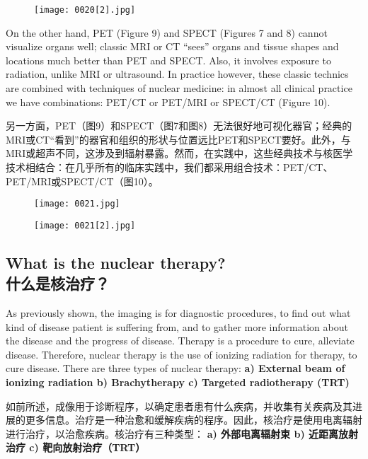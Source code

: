 \documentclass[dvipsnames, svgnames,a4paper,11pt]{article}
\begin{document}
  \begin{figure}[htbp]
      \centering
      \texttt{[image: 0020[2].jpg]}
       \label{fig8}
  \end{figure}
On the other hand, PET (Figure 9) and SPECT (Figures 7 and 8) cannot visualize organs well; classic MRI or CT “sees” organs and tissue shapes and locations much better than PET and SPECT. Also, it involves exposure to radiation, unlike MRI or ultrasound. In practice however, these classic technics are combined with techniques of nuclear medicine: in almost all clinical practice we have combinations: PET/CT or PET/MRI or SPECT/CT (Figure 10).

另一方面，PET（图9）和SPECT（图7和图8）无法很好地可视化器官；经典的MRI或CT“看到”的器官和组织的形状与位置远比PET和SPECT要好。此外，与MRI或超声不同，这涉及到辐射暴露。然而，在实践中，这些经典技术与核医学技术相结合：在几乎所有的临床实践中，我们都采用组合技术：PET/CT、PET/MRI或SPECT/CT（图10）。
\begin{figure}[htbp]
      \centering
      \texttt{[image: 0021.jpg]}
       \label{fig9}
  \end{figure}
  \begin{figure}[htbp]
      \centering
      \texttt{[image: 0021[2].jpg]}
       \label{fig10}
  \end{figure}
\subsection{What is the nuclear therapy?\\什么是核治疗？}
As previously shown, the imaging is for diagnostic procedures, to find out what kind of disease patient is suffering from, and to gather more information about the disease and the progress of disease. Therapy is a procedure to cure, alleviate disease. Therefore, nuclear therapy is the use of ionizing radiation for therapy, to cure disease. There are three types of nuclear therapy: \textbf{a) External beam of ionizing radiation b) Brachytherapy c) Targeted radiotherapy (TRT)}

如前所述，成像用于诊断程序，以确定患者患有什么疾病，并收集有关疾病及其进展的更多信息。治疗是一种治愈和缓解疾病的程序。因此，核治疗是使用电离辐射进行治疗，以治愈疾病。核治疗有三种类型： \textbf{a) 外部电离辐射束 b) 近距离放射治疗 c) 靶向放射治疗（TRT）}
\end{document}
